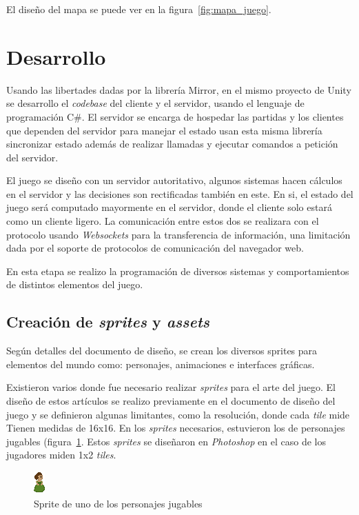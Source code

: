 El diseño del mapa se puede ver en la figura~\ref{fig:mapa_juego}.

\section{Desarrollo}
Usando las libertades dadas por la librería Mirror, en el mismo proyecto de Unity se desarrollo el \textit{codebase} del cliente y el servidor, usando el lenguaje de programación C\#. El servidor se encarga de hospedar las partidas y los clientes que dependen del servidor para manejar el estado usan esta misma librería sincronizar estado además de realizar llamadas y ejecutar comandos a petición del servidor.

El juego se diseño con un servidor autoritativo, algunos sistemas hacen cálculos en el servidor y las decisiones son rectificadas también en este. En si, el estado del juego será computado mayormente en el servidor, donde el cliente solo estará como un cliente ligero. La comunicación entre estos dos se realizara con el protocolo usando \textit{Websockets} para la transferencia de información, una limitación dada por el soporte de protocolos de comunicación del navegador web.

En esta etapa se realizo la programación de diversos sistemas y comportamientos de distintos elementos del juego.

\subsection{Creación de \textit{sprites} y \textit{assets}}
Según detalles del documento de diseño, se crean los diversos sprites para elementos del
mundo como: personajes, animaciones e interfaces gráficas.

Existieron varios donde fue necesario realizar \textit{sprites} para el arte del juego. El diseño de estos artículos se realizo previamente en el documento de diseño del juego y se definieron algunas limitantes, como la resolución, donde cada \textit{tile} mide Tienen medidas de 16x16. En los \textit{sprites} necesarios, estuvieron los de personajes jugables (figura~\ref{fig:sprite_johanna}. Estos \textit{sprites} se diseñaron en \textit{Photoshop} en el caso de los jugadores miden 1x2 \textit{tiles}.

\begin{figure}[h]
    \centering
    \includegraphics[width=0.2\linewidth]{images/JohannaOrdonez.png}
    \caption{Sprite de uno de los personajes jugables}
    \label{fig:sprite_johanna}
\end{figure}

